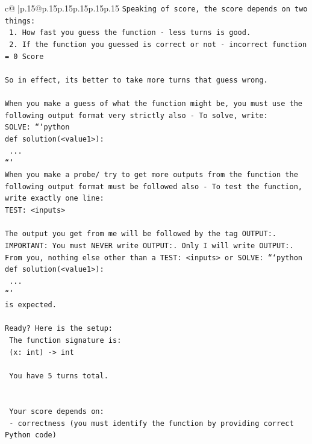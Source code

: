 \documentclass{article}
\begin{document}
{\begin{supertabular}{c@{$\;$}|p{.15\linewidth}@{}p{.15\linewidth}p{.15\linewidth}p{.15\linewidth}p{.15\linewidth}p{.15\linewidth}}
{{{\texttt{Speaking of score, the score depends on two things:} \\
\texttt{    1. How fast you guess the function {-} less turns is good.} \\
\texttt{    2. If the function you guessed is correct or not {-} incorrect function = 0 Score} \\
\\ 
\texttt{So in effect, its better to take more turns that guess wrong.} \\
\\ 
\texttt{When you make a guess of what the function might be, you must use the following output format very strictly also {-} To solve, write:} \\
\texttt{SOLVE: ```python} \\
\texttt{def solution(<value1>):} \\
\texttt{    ...} \\
\texttt{```} \\
\texttt{When you make a probe/ try to get more outputs from the function the following output format must be followed also {-} To test the function, write exactly one line:} \\
\texttt{TEST: <inputs>} \\
\\ 
\texttt{The output you get from me will be followed by the tag OUTPUT:.} \\
\texttt{IMPORTANT: You must NEVER write OUTPUT:. Only I will write OUTPUT:.} \\
\texttt{From you, nothing else other than a TEST: <inputs> or SOLVE: ```python} \\
\texttt{def solution(<value1>):} \\
\texttt{    ...} \\
\texttt{```} \\
\texttt{is expected.} \\
\\ 
\texttt{Ready? Here is the setup:} \\
\texttt{	The function signature is:} \\
\texttt{	(x: int) {-}> int} \\
\\ 
\texttt{	You have 5 turns total.} \\
\\ 
\\ 
\texttt{	Your score depends on:} \\
\texttt{		{-} correctness (you must identify the function by providing correct Python code)} \\
}}}
\end{supertabular}}
\end{document}
